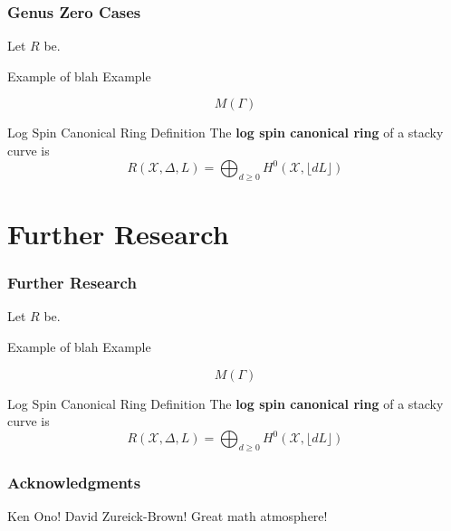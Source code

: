 \documentclass{beamer}
\theoremstyle{remark}
\newcommand \sx{{\mathscr X}}
\newcommand{\halfcan}{L}
\begin{document}
\begin{frame}
\frametitle{Genus Zero Cases}
Let $R$ be.

\pause
\begin{exampleblock}{Example of blah}
Example
\end{exampleblock}

\pause
\[
   M(\Gamma)
\]

\pause
\begin{alertblock}{Log Spin Canonical Ring Definition}
The \textbf{log spin canonical ring} of a stacky curve is
\[
	R(\sx, \Delta, \halfcan) = \bigoplus_{d \geq 0} H^0(\sx, \lfloor d \halfcan \rfloor)
\]
\end{alertblock}

\end{frame}

\section{Further Research} 

\begin{frame}
\frametitle{Further Research}
Let $R$ be.

\pause
\begin{exampleblock}{Example of blah}
Example
\end{exampleblock}

\pause
\[
   M(\Gamma)
\]

\pause
\begin{alertblock}{Log Spin Canonical Ring Definition}
The \textbf{log spin canonical ring} of a stacky curve is
\[
	R(\sx, \Delta, \halfcan) = \bigoplus_{d \geq 0} H^0(\sx, \lfloor d \halfcan \rfloor)
\]
\end{alertblock}

\end{frame}


\begin{frame}
\frametitle{Acknowledgments}
Ken Ono!
David Zureick-Brown!
Great math atmosphere!

\end{frame}
\end{document}
